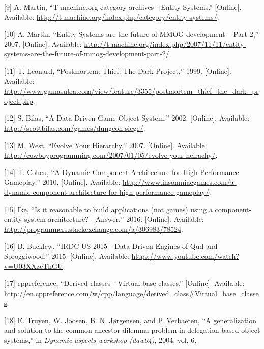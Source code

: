 \documentclass[twoside, 12pt, a4paper, openany]{book}
\begin{document}
\hypertarget{ref-tmachine_es_category}{}
{[}9{]} A. Martin, ``T-machine.org category archives - Entity Systems.''
{[}Online{]}. Available:
\url{http://t-machine.org/index.php/category/entity-systems/}.

\hypertarget{ref-tmachine_esmmogfuturep2_2007}{}
{[}10{]} A. Martin, ``Entity Systems are the future of MMOG development
-- Part 2,'' 2007. {[}Online{]}. Available:
\url{http://t-machine.org/index.php/2007/11/11/entity-systems-are-the-future-of-mmog-development-part-2/}.

\hypertarget{ref-tomleonard_thiefpostmortem_1999}{}
{[}11{]} T. Leonard, ``Postmortem: Thief: The Dark Project,'' 1999.
{[}Online{]}. Available:
\url{http://www.gamasutra.com/view/feature/3355/postmortem_thief_the_dark_project.php}.

\hypertarget{ref-scottbilas_dungeonsiege_2002}{}
{[}12{]} S. Bilas, ``A Data-Driven Game Object System,'' 2002.
{[}Online{]}. Available:
\url{http://scottbilas.com/games/dungeon-siege/}.

\hypertarget{ref-mickwest_evolveyourhierarchy_2007}{}
{[}13{]} M. West, ``Evolve Your Hierarchy,'' 2007. {[}Online{]}.
Available:
\url{http://cowboyprogramming.com/2007/01/05/evolve-your-heirachy/}.

\hypertarget{ref-terrancecohen_dynamiccomparchitecture_2010}{}
{[}14{]} T. Cohen, ``A Dynamic Component Architecture for High
Performance Gameplay,'' 2010. {[}Online{]}. Available:
\url{http://www.insomniacgames.com/a-dynamic-component-architecture-for-high-performance-gameplay/}.

\hypertarget{ref-stackexchange_ixe_answer}{}
{[}15{]} Ike, ``Is it reasonable to build applications (not games) using
a component-entity-system architecture? - Answer,'' 2016. {[}Online{]}.
Available: \url{http://programmers.stackexchange.com/a/306983/78524}.

\hypertarget{ref-sproggiwood_irdc_2015_talk}{}
{[}16{]} B. Bucklew, ``IRDC US 2015 - Data-Driven Engines of Qud and
Sproggiwood,'' 2015. {[}Online{]}. Available:
\url{https://www.youtube.com/watch?v=U03XXzcThGU}.

\hypertarget{ref-cppreference_virtual_base_classes}{}
{[}17{]} cppreference, ``Derived classes - Virtual base classes.''
{[}Online{]}. Available:
\url{http://en.cppreference.com/w/cpp/language/derived_class\#Virtual_base_classes}.

\hypertarget{ref-truyen2004generalization}{}
{[}18{]} E. Truyen, W. Joosen, B. N. Jørgensen, and P. Verbaeten, ``A
generalization and solution to the common ancestor dilemma problem in
delegation-based object systems,'' in \emph{Dynamic aspects workshop
(daw04)}, 2004, vol. 6.
\end{document}
